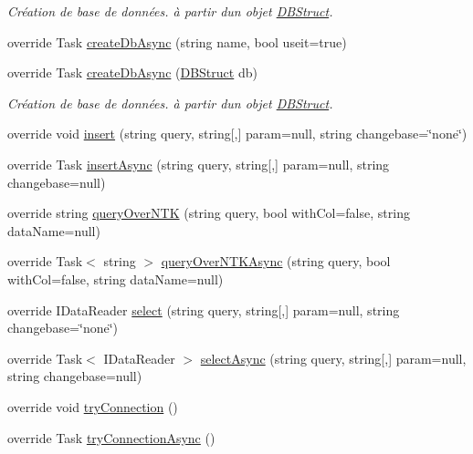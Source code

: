 \begin{DoxyCompactItemize}
\begin{DoxyCompactList}\small\item\em Création de base de données. à partir d\textquotesingle{}un objet \mbox{\hyperlink{class_n_t_k_1_1_database_1_1_d_b_struct}{D\+B\+Struct}}. \end{DoxyCompactList}\item 
override Task \mbox{\hyperlink{class_n_t_k_1_1_database_1_1_n_t_k_d___sqlite_a153cacf5d690a6b99ede5a781998c639}{create\+Db\+Async}} (string name, bool useit=true)
\item 
override Task \mbox{\hyperlink{class_n_t_k_1_1_database_1_1_n_t_k_d___sqlite_a9ab0bd0feb73015d6a3ccd9e4881318e}{create\+Db\+Async}} (\mbox{\hyperlink{class_n_t_k_1_1_database_1_1_d_b_struct}{D\+B\+Struct}} db)
\begin{DoxyCompactList}\small\item\em Création de base de données. à partir d\textquotesingle{}un objet \mbox{\hyperlink{class_n_t_k_1_1_database_1_1_d_b_struct}{D\+B\+Struct}}. \end{DoxyCompactList}\item 
override void \mbox{\hyperlink{class_n_t_k_1_1_database_1_1_n_t_k_d___sqlite_afdb261843de52ad7a74c22e30ff94825}{insert}} (string query, string\mbox{[},\mbox{]} param=null, string changebase=\char`\"{}none\char`\"{})
\item 
override Task \mbox{\hyperlink{class_n_t_k_1_1_database_1_1_n_t_k_d___sqlite_a837d400079384578838d759687f87db3}{insert\+Async}} (string query, string\mbox{[},\mbox{]} param=null, string changebase=null)
\item 
override string \mbox{\hyperlink{class_n_t_k_1_1_database_1_1_n_t_k_d___sqlite_a0edda2f8ed2b6fa0804e981b772d3b4c}{query\+Over\+N\+TK}} (string query, bool with\+Col=false, string data\+Name=null)
\item 
override Task$<$ string $>$ \mbox{\hyperlink{class_n_t_k_1_1_database_1_1_n_t_k_d___sqlite_abdd5676e9856bb63542fe48ba36e2374}{query\+Over\+N\+T\+K\+Async}} (string query, bool with\+Col=false, string data\+Name=null)
\item 
override I\+Data\+Reader \mbox{\hyperlink{class_n_t_k_1_1_database_1_1_n_t_k_d___sqlite_ad1298d0c33e36fc7ea48f511aebb21eb}{select}} (string query, string\mbox{[},\mbox{]} param=null, string changebase=\char`\"{}none\char`\"{})
\item 
override Task$<$ I\+Data\+Reader $>$ \mbox{\hyperlink{class_n_t_k_1_1_database_1_1_n_t_k_d___sqlite_a4af37b34c896824b4c1a60c8b8dc01f7}{select\+Async}} (string query, string\mbox{[},\mbox{]} param=null, string changebase=null)
\item 
override void \mbox{\hyperlink{class_n_t_k_1_1_database_1_1_n_t_k_d___sqlite_a4e9dc4e5e2b8a496faf48d63a47571e3}{try\+Connection}} ()
\item 
override Task \mbox{\hyperlink{class_n_t_k_1_1_database_1_1_n_t_k_d___sqlite_a328887404644a1e7c27aedfba50399d7}{try\+Connection\+Async}} ()
\end{DoxyCompactItemize}
